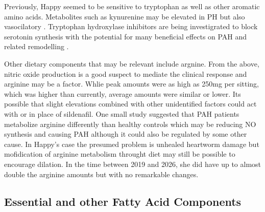 Previously, Happy seemed to be sensitive to tryptophan as well
as other aromatic amino acids. 
Metabolites such as kynurenine may be elevated in PH 
\cite{PMC11068393}
but
also vasocilatory
\cite{Nagy_Nagaraj_Meinitzer_intrinsic_tryptophan_metabolite_2017}.
Tryptophan hydroxylase inhibitors are being investigrated to
block serotonin synthesis with the potential for many beneficial
effects on PAH and related remodelling
\cite{PMC11334415}
\cite{Morecroft_Dempsie_Bader_Effect_Tryptophan_Hydroxylase_2007}.

Other dietary components that may be relevant include argnine.
From the above, nitric oxide production is a good suspect to mediate 
the clinical response and arginine may be a factor.
Whlie peak amounts were as high as 250mg per sitting, which was
higher than currently, average amounts were similar or lower.
Its possible that slight elevations combined with other
unidentified factors could act with or in place of sildenafil.
One small study suggested that PAH patients metabolize arginine
differently than healthy controls
\cite{Kao_Wedes_Hsu_Arginine_metabolic_endotypes_2015}
which may be reducing NO synthesis and causing PAH although it could
also be regulated by some other cause. In Happy's case the presumed
problem is unhealed heartworm damage but mofidication of arginine metabolism
throught diet may still be possible to encourage dilation. 
In the time between 2019 and 2026, she did have up to almost
double the arginine amounts but with no remarkable changes. 


\subsection{ Essential and other Fatty Acid  Components  }

